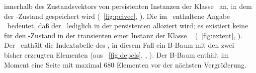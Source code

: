 innerhalb des Zustandsvektors von persistenten Instanzen der Klasse
\ an, in dem der \Slt\/-Zustand gespeichert wird
(\figurename~\ref{fig:pcivec}, \citepage{\pageref{fig:pcivec}}). Die
im \Slt\/ \ enthaltene Angabe
\ bedeutet, da\ss{} der \Slt\/ \ lediglich
in der persistenten \representation{} alloziert wird; es existiert keine
\representation{} f\"{u}r den \Slt\/-Zustand in der transienten
\representation{} einer Instanz der Klasse
\ \ifbericht%
\cite[]{bib:ki94a}%
\else%
(\figurename~\ref{fig:extent},
\citepage{\pageref{fig:extent}})\fi. Der \Slt\/ \
enth\"{a}lt die Indextabelle des \Slt[s],
in diesem Fall ein B-Baum mit den zwei bisher erzeugten Elementen
(aus \figurename~\ref{fig:depcls}, \citepage{\pageref{fig:depcls}},
\lprompt{\ref{enu:depclsmi}--\ref{enu:depclsmii}}). Der B-Baum
enth\"{a}lt im Moment eine Seite mit maximal 680 Elementen vor der
n\"{a}chsten Vergr\"{o}\ss{}erung.
%
